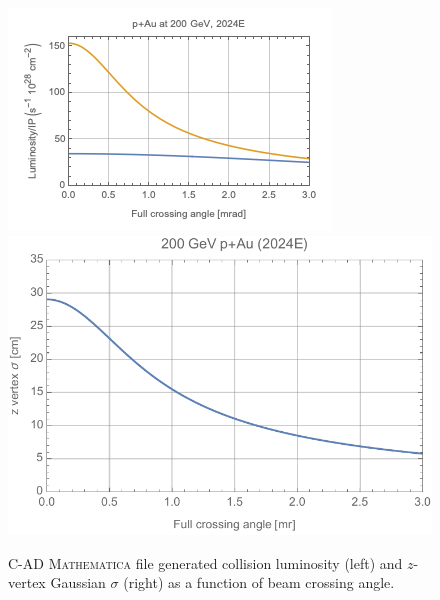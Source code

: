 \begin{figure}[h!]
    \centering
        \includegraphics[width=0.7\linewidth]{figs/figure_cad3_prelim.png}  
    \includegraphics[width=0.62\linewidth]{figs/pau200-2024-z-202008190.pdf}
    \caption{C-AD {\textsc{Mathematica}} file generated \pau collision luminosity (left) and $z$-vertex Gaussian $\sigma$ (right) as a function of beam crossing angle.}
    \label{fig:mathpau1}
\end{figure}

